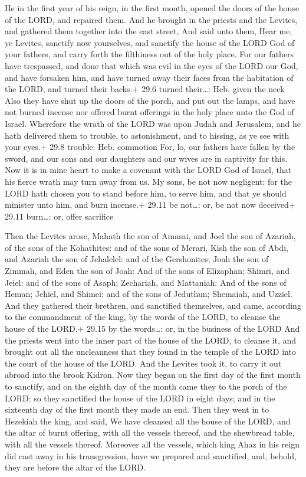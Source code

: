  He in the first year of his reign, in the first month,
opened the doors of the house of the LORD, and repaired them.
 And he brought in the priests and the Levites, and gathered
them together into the east street,  And said unto them,
Hear me, ye Levites, sanctify now yourselves, and sanctify the house of
the LORD God of your fathers, and carry forth the filthiness out of the
holy place.  For our fathers have trespassed, and done that
which was evil in the eyes of the LORD our God, and have forsaken him,
and have turned away their faces from the habitation of the LORD, and
turned their backs.+ 29.6 turned their\ldots: Heb. given the neck
 Also they have shut up the doors of the porch, and put out
the lamps, and have not burned incense nor offered burnt offerings in
the holy place unto the God of Israel.  Wherefore the wrath
of the LORD was upon Judah and Jerusalem, and he hath delivered them to
trouble, to astonishment, and to hissing, as ye see with your eyes.+
29.8 trouble: Heb. commotion  For, lo, our fathers have
fallen by the sword, and our sons and our daughters and our wives are in
captivity for this.  Now it is in mine heart to make a
covenant with the LORD God of Israel, that his fierce wrath may turn
away from us.  My sons, be not now negligent: for the LORD
hath chosen you to stand before him, to serve him, and that ye should
minister unto him, and burn incense.+ 29.11 be not\ldots: or, be not now
deceived+ 29.11 burn\ldots: or, offer sacrifice

 Then the Levites arose, Mahath the son of Amasai, and
Joel the son of Azariah, of the sons of the Kohathites: and of the sons
of Merari, Kish the son of Abdi, and Azariah the son of Jehalelel: and
of the Gershonites; Joah the son of Zimmah, and Eden the son of Joah:
 And of the sons of Elizaphan; Shimri, and Jeiel: and of
the sons of Asaph; Zechariah, and Mattaniah:  And of the
sons of Heman; Jehiel, and Shimei: and of the sons of Jeduthun;
Shemaiah, and Uzziel.  And they gathered their brethren,
and sanctified themselves, and came, according to the commandment of the
king, by the words of the LORD, to cleanse the house of the LORD.+ 29.15
by the words\ldots: or, in the business of the LORD  And
the priests went into the inner part of the house of the LORD, to
cleanse it, and brought out all the uncleanness that they found in the
temple of the LORD into the court of the house of the LORD. And the
Levites took it, to carry it out abroad into the brook Kidron.
 Now they began on the first day of the first month to
sanctify, and on the eighth day of the month came they to the porch of
the LORD: so they sanctified the house of the LORD in eight days; and in
the sixteenth day of the first month they made an end. 
Then they went in to Hezekiah the king, and said, We have cleansed all
the house of the LORD, and the altar of burnt offering, with all the
vessels thereof, and the shewbread table, with all the vessels thereof.
 Moreover all the vessels, which king Ahaz in his reign did
cast away in his transgression, have we prepared and sanctified, and,
behold, they are before the altar of the LORD.

